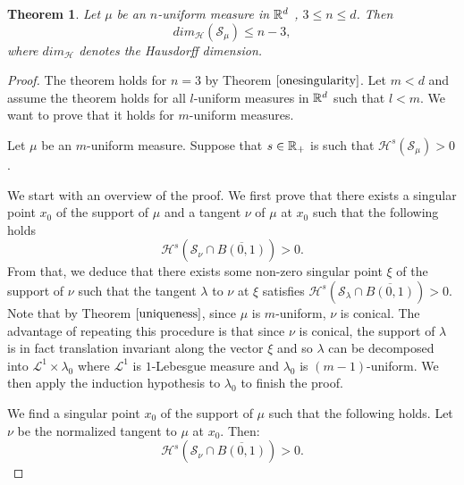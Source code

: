 \documentclass[11pt]{article}
\newtheorem{theorem}{Theorem}[section]
\theoremstyle{definition}
\theoremstyle{remark}
\numberwithin{equation}{section}
\let\inf\relax \DeclareMathOperator*\inf{\vphantom{p}inf}
\begin{document}
 \begin{theorem}
 Let $\mu$ be an $n$-uniform measure in $\mathbb{R}^{d}$ , $ 3 \leq n \leq d$. Then 
 \begin{equation} \label{hdimsing}
 dim_{\mathcal{H}}(\mathcal{S}_{\mu}) \leq n-3,
\end{equation}
where $dim_{\mathcal{H}}$ denotes the Hausdorff dimension.
\end{theorem}
\begin{proof}

The theorem holds for $n=3$ by Theorem $\ref{onesingularity}$.
Let $m< d$ and assume the theorem holds for all $l$-uniform measures in $\mathbb{R}^{d}$ such that $l < m$. We want to prove that it holds for $m$-uniform measures.

Let $\mu$ be an $m$-uniform measure.
Suppose that $s \in \mathbb{R}_{+}$ is such that $\mathcal{H}^{s}(\mathcal{S}_{\mu}) >0$.

We start with an overview of the proof. We first prove that there exists a singular point $x_0$ of the support of $\mu$ and  a tangent $\nu$ of $\mu$ at $x_0$ such that the following holds
$$\mathcal{H}^{s}(\mathcal{S}_{\nu} \cap \overline{B(0,1)})>0.$$
From that, we deduce that there exists some non-zero singular point $\xi$ of the support of $\nu$ such that the tangent $\lambda$ to $\nu$ at $\xi$ satisfies $\mathcal{H}^{s}(\mathcal{S}_{\lambda} \cap \overline{B(0,1)})>0$. Note that by Theorem $\ref{uniqueness}$, since $\mu$ is $m$-uniform, $\nu$ is conical. The advantage of repeating this procedure is that since $\nu$ is conical, the support of $\lambda$ is in fact translation invariant along the vector $\xi$ and so $\lambda$ can be decomposed into $\mathcal{L}^1 \times \lambda_0$ where $\mathcal{L}^1$ is $1$-Lebesgue measure and $\lambda_0$ is $(m-1)$-uniform. We then apply the induction hypothesis to $\lambda_0$ to finish the proof.

We find  a singular point $x_0$ of the support of $\mu$ such that the following holds. Let $\nu$ be the normalized tangent to $\mu$ at $x_0$. Then:
$$\mathcal{H}^{s}(\mathcal{S}_{\nu} \cap \overline{B(0,1)})>0.$$


\end{proof}
\end{document}

